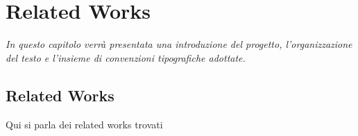 \chapter{Related Works}
\label{cap:RelatedWorks}

\textit{\indent In questo capitolo verrà presentata una introduzione del progetto, l'organizzazione del testo e l'insieme di convenzioni tipografiche adottate.
}
\section{Related Works}

Qui si parla dei related works trovati


